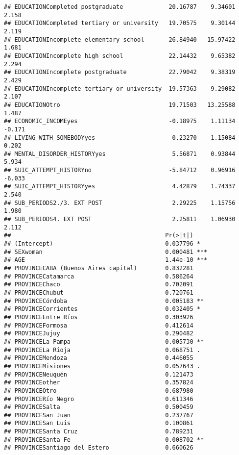 \documentclass[
]{book}
\begin{document}
\begin{verbatim}
## EDUCATIONCompleted postgraduate             20.16787    9.34601   2.158
## EDUCATIONCompleted tertiary or university   19.70575    9.30144   2.119
## EDUCATIONIncomplete elementary school       26.84940   15.97422   1.681
## EDUCATIONIncomplete high school             22.14432    9.65382   2.294
## EDUCATIONIncomplete postgraduate            22.79042    9.38319   2.429
## EDUCATIONIncomplete tertiary or university  19.57363    9.29082   2.107
## EDUCATIONOtro                               19.71503   13.25588   1.487
## ECONOMIC_INCOMEyes                          -0.18975    1.11134  -0.171
## LIVING_WITH_SOMEBODYyes                      0.23270    1.15084   0.202
## MENTAL_DISORDER_HISTORYyes                   5.56871    0.93844   5.934
## SUIC_ATTEMPT_HISTORYno                      -5.84712    0.96916  -6.033
## SUIC_ATTEMPT_HISTORYyes                      4.42879    1.74337   2.540
## SUB_PERIODS2./3. EXT POST                    2.29225    1.15756   1.980
## SUB_PERIODS4. EXT POST                       2.25811    1.06930   2.112
##                                            Pr(>|t|)    
## (Intercept)                                0.037796 *  
## SEXwoman                                   0.000481 ***
## AGE                                        1.44e-10 ***
## PROVINCECABA (Buenos Aires capital)        0.832281    
## PROVINCECatamarca                          0.586264    
## PROVINCEChaco                              0.702091    
## PROVINCEChubut                             0.720761    
## PROVINCECórdoba                            0.005183 ** 
## PROVINCECorrientes                         0.032405 *  
## PROVINCEEntre Ríos                         0.303926    
## PROVINCEFormosa                            0.412614    
## PROVINCEJujuy                              0.290482    
## PROVINCELa Pampa                           0.005730 ** 
## PROVINCELa Rioja                           0.068751 .  
## PROVINCEMendoza                            0.446055    
## PROVINCEMisiones                           0.057643 .  
## PROVINCENeuquén                            0.121473    
## PROVINCEother                              0.357824    
## PROVINCEOtro                               0.687980    
## PROVINCERío Negro                          0.611346    
## PROVINCESalta                              0.500459    
## PROVINCESan Juan                           0.237767    
## PROVINCESan Luis                           0.100861    
## PROVINCESanta Cruz                         0.789231    
## PROVINCESanta Fe                           0.008702 ** 
## PROVINCESantiago del Estero                0.660626    

\end{verbatim}
\end{document}
